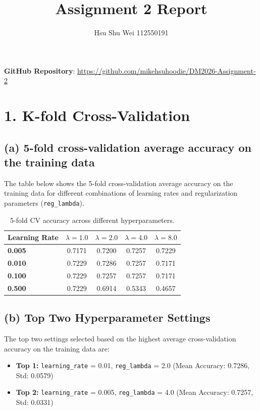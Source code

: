 \documentclass[11pt, a4paper]{article}
\date{\vspace{-4em}}
\title{\textbf{Assignment 2 Report}}
\author{Hsu Shu Wei 112550191}
\begin{document}
\maketitle

\noindent
\textbf{GitHub Repository}: \url{https://github.com/mikehsuhoodie/DM2026-Assignment-2}

\section*{1. K-fold Cross-Validation}
\subsection*{(a) 5-fold cross-validation average accuracy on the training data}

The table below shows the 5-fold cross-validation average accuracy on the training data for different combinations of learning rates and regularization parameters (\texttt{reg\_lambda}).

\begin{table}[H]
    \centering
    \begin{tabular}{@{}lcccc@{}}
        \toprule
        \textbf{Learning Rate} & \textbf{$\lambda = 1.0$} & \textbf{$\lambda = 2.0$} & \textbf{$\lambda = 4.0$} & \textbf{$\lambda = 8.0$} \\ \midrule
        \textbf{0.005}         & 0.7171                 & 0.7200                 & 0.7257                 & 0.7229                 \\
        \textbf{0.010}         & 0.7229                 & 0.7286                 & 0.7257                 & 0.7171                 \\
        \textbf{0.100}         & 0.7229                 & 0.7257                 & 0.7257                 & 0.7171                 \\
        \textbf{0.500}         & 0.7229                 & 0.6914                 & 0.5343                 & 0.4657                 \\ \bottomrule
    \end{tabular}
    \caption{5-fold CV accuracy across different hyperparameters.}
\end{table}

\subsection*{(b) Top Two Hyperparameter Settings}

The top two settings selected based on the highest average cross-validation accuracy on the training data are:
\begin{itemize}
    \item \textbf{Top 1:} \texttt{learning\_rate} = 0.01, \texttt{reg\_lambda} = 2.0 (Mean Accuracy: 0.7286, Std: 0.0579)
    \item \textbf{Top 2:} \texttt{learning\_rate} = 0.005, \texttt{reg\_lambda} = 4.0 (Mean Accuracy: 0.7257, Std: 0.0331)
\end{itemize}
\end{document}
